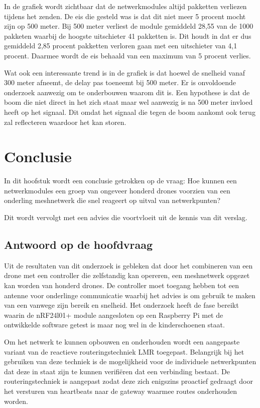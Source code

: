 \documentclass[a4paper, 11pt, oneside]{report}
\begin{document}
In de grafiek wordt zichtbaar dat de netwerkmodules altijd pakketten verliezen tijdens het zenden.
De eis die gesteld was is dat dit niet meer 5 procent mocht zijn op 500 meter.
Bij 500 meter verliest de module gemiddeld 28,55 van de 1000 pakketen waarbij de hoogste uitschieter 41 pakketten is.
Dit houdt in dat er dus gemiddeld 2,85 procent pakketten verloren gaan met een uitschieter van 4,1 procent.
Daarmee wordt de eis behaald van een maximum van 5 procent verlies. 

Wat ook een interessante trend is in de grafiek is dat hoewel de snelheid vanaf 300 meter afneemt, de delay pas toeneemt bij 500 meter. Er is onvoldoende onderzoek aanwezig om te onderbouwen waarom dit is. Een hypothese is dat de boom die niet direct in het zich staat maar wel aanwezig is na 500 meter invloed heeft op het signaal. Dit omdat het signaal die tegen de boom aankomt ook terug zal reflecteren waardoor het kan storen.  


\chapter{Conclusie}
\label{chapter:conclusie}
In dit hoofstuk wordt een conclusie getrokken op de vraag: Hoe kunnen een netwerkmodules een groep van ongeveer honderd drones voorzien van een onderling meshnetwerk die snel reageert op uitval van netwerkpunten?

Dit wordt vervolgt met een advies die voortvloeit uit de kennis van dit verslag.

\section{Antwoord op de hoofdvraag}

Uit de resultaten van dit onderzoek is gebleken dat door het combineren van een drone met een controller die zelfstandig kan opereren, een meshnetwerk opgezet kan worden van honderd drones. De controller moet toegang hebben tot een antenne voor onderlinge communicatie waarbij het advies is om gebruik te maken van een  vanwege zijn bereik en snelheid. Het onderzoek heeft de fase bereikt waarin de nRF24l01+ module aangesloten op een Raspberry Pi met de ontwikkelde software getest is maar nog wel in de kinderschoenen staat. 

Om het netwerk te kunnen opbouwen en onderhouden wordt een aangepaste variant van de reactieve routeringstechniek LMR toegepast. Belangrijk bij het gebruiken van deze techniek is de mogelijkheid voor de individuele netwerkpunten dat deze in staat zijn te kunnen verifiëren dat een verbinding bestaat. De routeringstechniek is aangepast zodat deze zich enigszins proactief gedraagt door het versturen van heartbeats naar de gateway waarmee routes onderhouden worden. 
\end{document}
